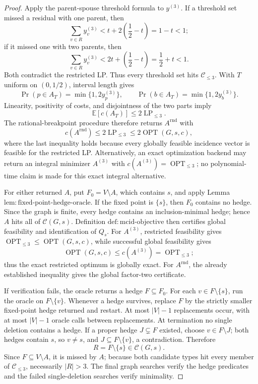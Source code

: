 \documentclass{article}
\begin{document}
\begin{proof}
Apply the parent-spouse threshold formula to \(y^{(3)}\).  If a threshold
set missed a residual with one parent, then
\[
 \sum_{v\in R}y^{(3)}_v
 <t+2\left(\frac12-t\right)=1-t<1;
\]
if it missed one with two parents, then
\[
 \sum_{v\in R}y^{(3)}_v
 <2t+\left(\frac12-t\right)=\frac12+t<1.
\]
Both contradict the restricted LP.  Thus every threshold set hits
\(\mathcal C_{\leq3}\).  With \(T\) uniform on \((0,1/2)\), interval
length gives
\[
 \Pr(p\in A_T)=\min\{1,2y^{(3)}_p\},
 \qquad
 \Pr(b\in A_T)=\min\{1,2y^{(3)}_b\}.
\]
Linearity, positivity of costs, and disjointness of the two parts imply
\[
 \mathbb E[c(A_T)]\leq2\operatorname{LP}_{\leq3}.
\]
The rational-breakpoint procedure therefore returns
\(A^{\mathrm{rnd}}\) with
\[
 c(A^{\mathrm{rnd}})\leq2\operatorname{LP}_{\leq3}
 \leq2\operatorname{OPT}(G,s,c),
\]
where the last inequality holds because every globally feasible incidence
vector is feasible for the restricted LP.  Alternatively, an exact
optimization backend may return an integral minimizer \(A^{(3)}\) with
\(c(A^{(3)})=\operatorname{OPT}_{\leq3}\); no polynomial-time claim is
made for this exact integral alternative.

For either returned \(A\), put \(F_0=V\setminus A\), which contains \(s\),
and apply Lemma
\(\mathrm{lem{:}fixed\mbox{-}point\mbox{-}hedge\mbox{-}oracle}\).  If the
fixed point is \(\{s\}\), then \(F_0\) contains no hedge.  Since the graph
is finite, every hedge contains an inclusion-minimal hedge; hence \(A\)
hits all of \(\mathcal C(G,s)\).  Definition
\(\mathrm{def{:}mcid\mbox{-}objective}\) then certifies global feasibility
and identification of \(Q_s\).  For \(A^{(3)}\), restricted feasibility
gives \(\operatorname{OPT}_{\leq3}\leq\operatorname{OPT}(G,s,c)\), while
successful global feasibility gives
\[
 \operatorname{OPT}(G,s,c)
 \leq c(A^{(3)})=\operatorname{OPT}_{\leq3};
\]
thus the exact restricted optimum is globally exact.  For
\(A^{\mathrm{rnd}}\), the already established inequality gives the global
factor-two certificate.

If verification fails, the oracle returns a hedge \(F\subseteq F_0\).
For each \(v\in F\setminus\{s\}\), run the oracle on
\(F\setminus\{v\}\).  Whenever a hedge survives, replace \(F\) by the
strictly smaller fixed-point hedge returned and restart.  At most
\(|V|-1\) replacements occur, with at most \(|V|-1\) oracle calls between
replacements.  At termination no single deletion contains a hedge.  If a
proper hedge \(J\subsetneq F\) existed, choose
\(v\in F\setminus J\); both hedges contain \(s\), so \(v\neq s\), and
\(J\subseteq F\setminus\{v\}\), a contradiction.  Therefore
\[
 R=F\setminus\{s\}\in\mathcal C(G,s).
\]
Since \(F\subseteq V\setminus A\), it is missed by \(A\); because both
candidate types hit every member of \(\mathcal C_{\leq3}\), necessarily
\(|R|>3\).  The final graph searches verify the hedge predicates and the
failed single-deletion searches verify minimality.


\end{proof}
\end{document}
